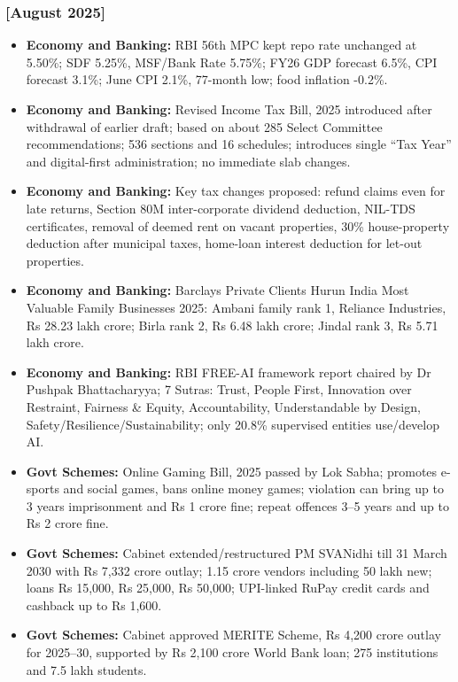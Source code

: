 \documentclass[10pt,a4paper]{article}
\newcommand{\monthtag}[1]{\textbf{[#1]}}
\begin{document}
\subsubsection{\monthtag{August 2025}}
\begin{itemize}
    \item \textbf{Economy and Banking:} RBI 56th MPC kept repo rate unchanged at 5.50\%; SDF 5.25\%, MSF/Bank Rate 5.75\%; FY26 GDP forecast 6.5\%, CPI forecast 3.1\%; June CPI 2.1\%, 77-month low; food inflation -0.2\%.
    \item \textbf{Economy and Banking:} Revised Income Tax Bill, 2025 introduced after withdrawal of earlier draft; based on about 285 Select Committee recommendations; 536 sections and 16 schedules; introduces single ``Tax Year'' and digital-first administration; no immediate slab changes.
    \item \textbf{Economy and Banking:} Key tax changes proposed: refund claims even for late returns, Section 80M inter-corporate dividend deduction, NIL-TDS certificates, removal of deemed rent on vacant properties, 30\% house-property deduction after municipal taxes, home-loan interest deduction for let-out properties.
    \item \textbf{Economy and Banking:} Barclays Private Clients Hurun India Most Valuable Family Businesses 2025: Ambani family rank 1, Reliance Industries, Rs 28.23 lakh crore; Birla rank 2, Rs 6.48 lakh crore; Jindal rank 3, Rs 5.71 lakh crore.
    \item \textbf{Economy and Banking:} RBI FREE-AI framework report chaired by Dr Pushpak Bhattacharyya; 7 Sutras: Trust, People First, Innovation over Restraint, Fairness \& Equity, Accountability, Understandable by Design, Safety/Resilience/Sustainability; only 20.8\% supervised entities use/develop AI.
    \item \textbf{Govt Schemes:} Online Gaming Bill, 2025 passed by Lok Sabha; promotes e-sports and social games, bans online money games; violation can bring up to 3 years imprisonment and Rs 1 crore fine; repeat offences 3--5 years and up to Rs 2 crore fine.
    \item \textbf{Govt Schemes:} Cabinet extended/restructured PM SVANidhi till 31 March 2030 with Rs 7,332 crore outlay; 1.15 crore vendors including 50 lakh new; loans Rs 15,000, Rs 25,000, Rs 50,000; UPI-linked RuPay credit cards and cashback up to Rs 1,600.
    \item \textbf{Govt Schemes:} Cabinet approved MERITE Scheme, Rs 4,200 crore outlay for 2025--30, supported by Rs 2,100 crore World Bank loan; 275 institutions and 7.5 lakh students.

\end{itemize}
\end{document}
